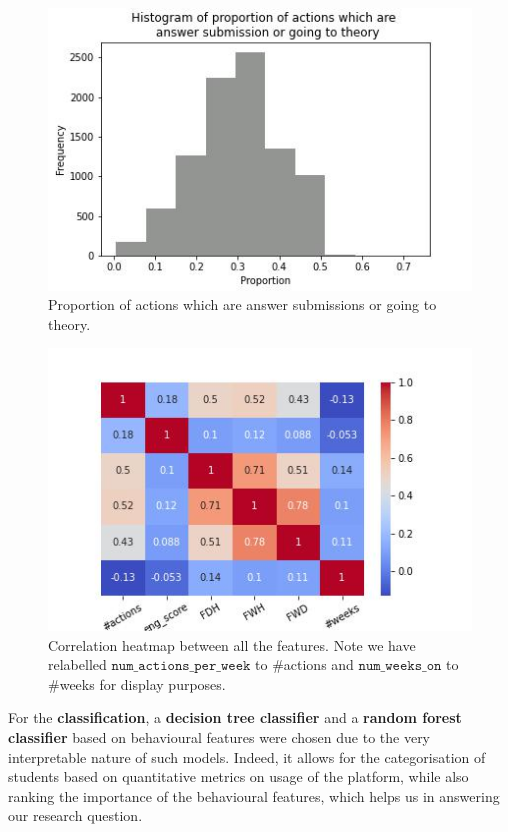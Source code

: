 \documentclass[sigplan,screen]{acmart}
\begin{document}
\begin{figure}
    \centering
    \includegraphics[width=\linewidth]{reports/figures/eng_score_hist.jpg}
    \caption{Proportion of actions which are answer submissions or going to theory.}
    \label{fig:eng_score}
\end{figure}


\begin{figure}
    \centering
    \includegraphics[width=\linewidth]{reports/figures/feature_corr.jpg}
    \caption{Correlation heatmap between all the features. Note we have relabelled $\texttt{num\_actions\_per\_week}$ to \#actions and $\texttt{num\_weeks\_on}$ to \#weeks for display purposes.}
    \label{fig:feature_corr}
\end{figure}



For the \textbf{classification}, a \textbf{decision tree classifier} and a \textbf{random forest classifier} based on behavioural features were chosen due to the very interpretable nature of such models. Indeed, it allows for the categorisation of students based on quantitative metrics on usage of the platform, while also ranking the importance of the behavioural features, which helps us in answering our research question. 
\end{document}
